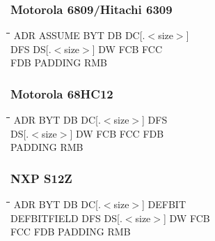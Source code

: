 \subsubsection{Motorola 6809/Hitachi 6309}
{\tt\begin{tabbing}
\hspace{3cm}\=\hspace{3cm}\=\hspace{3cm}\=\hspace{3cm}\=\kill
ADR        \> ASSUME      \> BYT         \> DB          \> DC[.$<$size$>$] \\
DFS        \> DS[.$<$size$>$] \> DW      \> FCB         \> FCC \\
FDB        \> PADDING     \> RMB \\
\end{tabbing}}

\subsubsection{Motorola 68HC12}
{\tt\begin{tabbing}
\hspace{3cm}\=\hspace{3cm}\=\hspace{3cm}\=\hspace{3cm}\=\kill
ADR        \> BYT         \> DB          \> DC[.$<$size$>$] \> DFS     \\
DS[.$<$size$>$] DW        \> FCB         \> FCC         \> FDB \\
PADDING     \> RMB \\
\end{tabbing}}

\subsubsection{NXP S12Z}
{\tt\begin{tabbing}
\hspace{3cm}\=\hspace{3cm}\=\hspace{3cm}\=\hspace{3cm}\=\kill
ADR        \> BYT         \> DB          \> DC[.$<$size$>$] \> DEFBIT \\
DEFBITFIELD \> DFS        \> DS[.$<$size$>$] \> DW          \> FCB \\
FCC     \> FDB \> PADDING \> RMB \\
\end{tabbing}}

